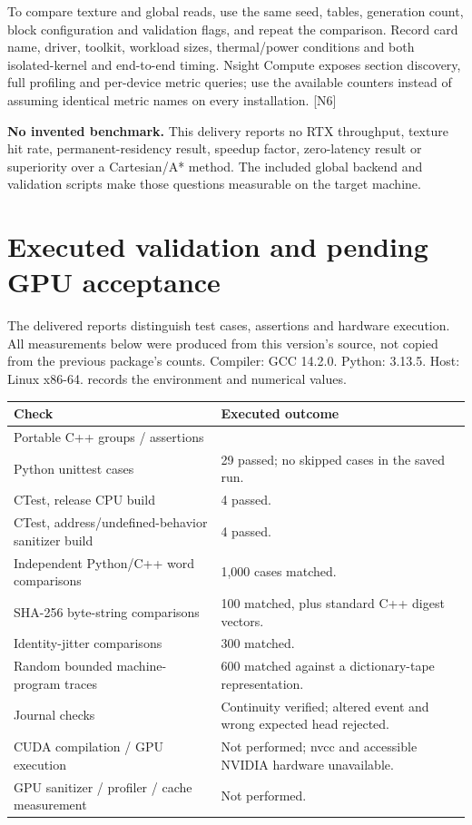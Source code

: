 \documentclass[11pt,a4paper]{article}
\newcommand{\ext}[1]{\textcolor{muted}{[N#1]}}
\newcommand{\code}[1]{\texttt{\detokenize{#1}}}
\begin{document}
To compare texture and global reads, use the same seed, tables, generation count, block configuration and validation flags, and repeat the comparison. Record card name, driver, toolkit, workload sizes, thermal/power conditions and both isolated-kernel and end-to-end timing. Nsight Compute exposes section discovery, full profiling and per-device metric queries; use the available counters instead of assuming identical metric names on every installation. \ext{6}

\begin{contract}
\textbf{No invented benchmark.} This delivery reports no RTX throughput, texture hit rate, permanent-residency result, speedup factor, zero-latency result or superiority over a Cartesian/A* method. The included global backend and validation scripts make those questions measurable on the target machine.
\end{contract}
\clearpage

\section{Executed validation and pending GPU acceptance}\label{sec:validation}
The delivered reports distinguish test cases, assertions and hardware execution. All measurements below were produced from this version's source, not copied from the previous package's counts. Compiler: GCC 14.2.0. Python: 3.13.5. Host: Linux x86-64. \code{results/validation_summary.json} records the environment and numerical values.

\small
\begin{tabularx}{\textwidth}{@{}P{75mm}Y@{}}\toprule
\textbf{Check} & \textbf{Executed outcome}\\\midrule
Portable C++ groups / assertions & \\
Python unittest cases & 29 passed; no skipped cases in the saved run.\\
CTest, release CPU build & 4 passed.\\
CTest, address/undefined-behavior sanitizer build & 4 passed.\\
Independent Python/C++ word comparisons & 1,000 cases matched.\\
SHA-256 byte-string comparisons & 100 matched, plus standard C++ digest vectors.\\
Identity-jitter comparisons & 300 matched.\\
Random bounded machine-program traces & 600 matched against a dictionary-tape representation.\\
Journal checks & Continuity verified; altered event and wrong expected head rejected.\\
CUDA compilation / GPU execution & Not performed; nvcc and accessible NVIDIA hardware unavailable.\\
GPU sanitizer / profiler / cache measurement & Not performed.\\\bottomrule
\end{tabularx}\normalsize
\end{document}

